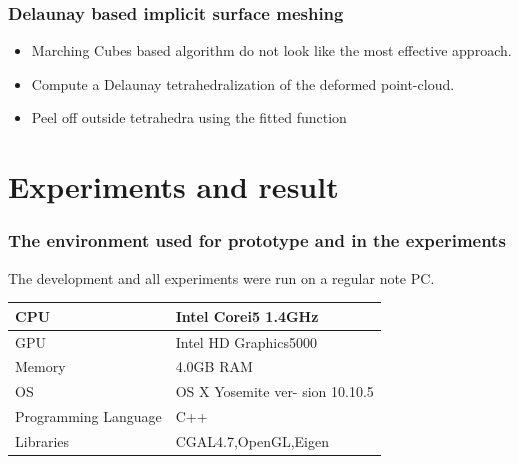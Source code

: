\documentclass{beamer}
\begin{document}
\begin {frame}
\frametitle{Delaunay based implicit surface meshing}
\Large
\begin{itemize}
\item Marching Cubes based algorithm do not look like the most effective approach.\\
\item Compute a Delaunay tetrahedralization of the deformed point-cloud.\\
\item Peel off outside tetrahedra using the fitted function\\
\end{itemize}
\end{frame}


\section{Experiments and result}

\begin{frame}
\frametitle{The environment used for prototype and in the experiments}
\Large
The development and all experiments were run on a regular note PC. \\
\begin{table}
\begin{center}
\begin{tabular}{|p{3cm}|p{7cm}|} 
\hline
CPU & Intel Corei5 1.4GHz \\ 
\hline
GPU & Intel HD Graphics5000 \\ 
\hline
Memory & 4.0GB RAM \\ 
\hline
OS & OS X Yosemite ver- sion 10.10.5 \\  
\hline
Programming Language & C++ \\
\hline 
Libraries & CGAL4.7,OpenGL,Eigen \\ 
\hline
\end{tabular}
\end{center}
\end{table}

\end{frame}
\end{document}
